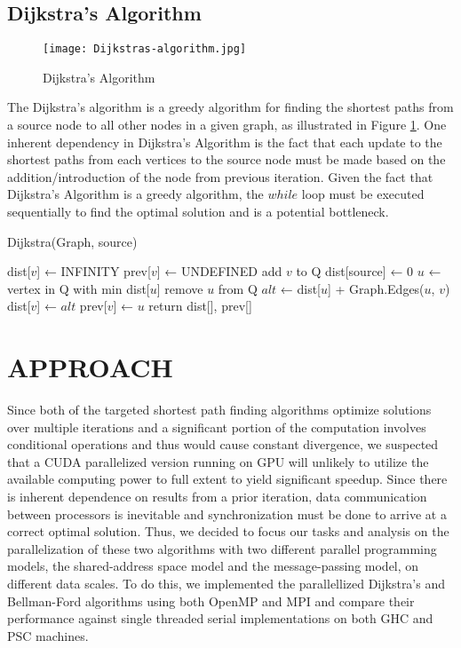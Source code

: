 \documentclass[12pt]{article}
\begin{document}
\subsection{Dijkstra's Algorithm}
\begin{figure}[hbt!]
\begin{center}
  \texttt{[image: Dijkstras-algorithm.jpg]}
  \caption{Dijkstra's Algorithm \cite{stechies}}
  \label{fig:dij}
  \end{center}
\end{figure}
The Dijkstra's algorithm is a greedy algorithm for finding the shortest paths from a source node to all other nodes in a given graph, as illustrated in Figure \ref{fig:dij}. One inherent dependency in Dijkstra's Algorithm is the fact that each update to the shortest paths from each vertices to the source node must be made based on the addition/introduction of the node from previous iteration. Given the fact that Dijkstra's Algorithm is a greedy algorithm, the $while$ loop must be executed sequentially to find the optimal solution and is a potential bottleneck.
\begin{algorithm}
	\caption{Dijkstra(Graph, source)} 
	\begin{algorithmic}[1]
		    \State dist[$v$] ← INFINITY
		    \State prev[$v$] ← UNDEFINED  
		    \State add $v$ to Q
		\EndFor
		\State dist[source] ← 0
		    \State $u$ ← vertex in Q with min dist[$u$]
		    \State remove $u$ from Q
		        \State $alt$ ← dist[$u$] + Graph.Edges($u$, $v$)
                    \State dist[$v$] ← $alt$
                    \State prev[$v$] ← $u$
                \EndIf 
		    \EndFor
		\EndWhile
	\State return dist[], prev[]
	\end{algorithmic} 
\end{algorithm}

\newpage
\section{APPROACH}
Since both of the targeted shortest path finding algorithms optimize solutions over multiple iterations and a significant portion of the computation involves conditional operations and thus would cause constant divergence, we suspected that a CUDA parallelized version running on GPU will unlikely to utilize the available computing power to full extent to yield significant speedup. Since there is inherent dependence on results from a prior iteration, data communication between processors is inevitable and synchronization must be done to arrive at a correct optimal solution. Thus, we decided to focus our tasks and analysis on the parallelization of these two algorithms with two different parallel programming models, the shared-address space model and the message-passing model, on different data scales. To do this, we implemented the parallellized Dijkstra's and Bellman-Ford algorithms using both OpenMP and MPI and compare their performance against single threaded serial implementations on both GHC and PSC machines.
\end{document}
